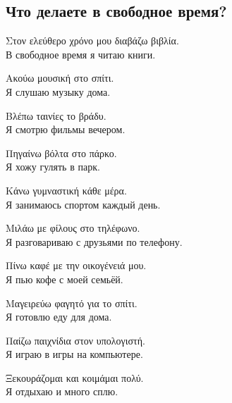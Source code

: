 \documentclass[12pt]{article}
\newcommand{\my}[1]{\textcolor{gray!80!white}{#1}}
\newenvironment{page}{\clearpage\normalsize\null\vfill}{\vfill\null}
\newenvironment{textblock}{\begin{minipage}{\textwidth}}{\end{minipage}\smallskip}
\begin{document}
	\begin{page}
		\subsection{Что делаете в свободное время?}
		\small
		\begin{textblock}
			Στον ελεύθερο χρόνο μου διαβάζω βιβλία.\\
			\my{В свободное время я читаю книги.}
			
			Ακούω μουσική στο σπίτι.\\
			\my{Я слушаю музыку дома.}
			
			Βλέπω ταινίες το βράδυ.\\
			\my{Я смотрю фильмы вечером.}
			
			Πηγαίνω βόλτα στο πάρκο.\\
			\my{Я хожу гулять в парк.}
			
			Κάνω γυμναστική κάθε μέρα.\\
			\my{Я занимаюсь спортом каждый день.}
			
			Μιλάω με φίλους στο τηλέφωνο.\\
			\my{Я разговариваю с друзьями по телефону.}
			
			Πίνω καφέ με την οικογένειά μου.\\
			\my{Я пью кофе с моей семьёй.}
			
			Μαγειρεύω φαγητό για το σπίτι.\\
			\my{Я готовлю еду для дома.}
			
			Παίζω παιχνίδια στον υπολογιστή.\\
			\my{Я играю в игры на компьютере.}
			
			Ξεκουράζομαι και κοιμάμαι πολύ.\\
			\my{Я отдыхаю и много сплю.}
		\end{textblock}
	\end{page}
	
\end{document}
